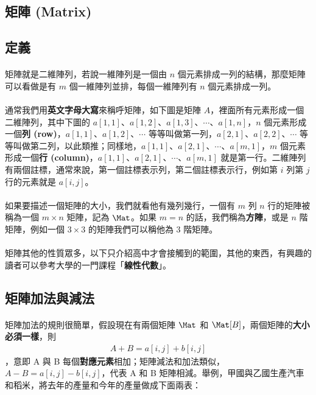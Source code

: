 \documentclass[12pt,a4paper,oneside]{report}
\begin{document}
\begin{CJK}{UTF8}{bkai}
\section{矩陣 (Matrix)}
\subsection{定義}

\paragraph{}矩陣就是二維陣列，若說一維陣列是一個由 $n$ 個元素排成一列的結構，那麼矩陣可以看做是有 $m$ 個一維陣列並排，每個一維陣列有 $n$ 個元素排成一列。
\paragraph{}通常我們用\textbf{英文字母大寫}來稱呼矩陣，如下圖是矩陣 $A$，裡面所有元素形成一個二維陣列，其中下圖的 $a[1,1]$、$a[1,2]$、$a[1,3]$、$\cdots$、$a[1,n]$，$n$ 個元素形成一個\textbf{列 (row)}，$a[1,1]$、$a[1,2]$、$\cdots$ 等等叫做第一列，$a[2,1]$、$a[2,2]$、$\cdots$ 等等叫做第二列，以此類推；同樣地，$a[1,1]$、$a[2,1]$、$\cdots$、$a[m,1]$，$m$ 個元素形成一個\textbf{行 (column)}，$a[1,1]$、$a[2,1]$、$\cdots$、$a[m,1]$ 就是第一行。二維陣列有兩個註標，通常來說，第一個註標表示列，第二個註標表示行，例如第 $i$ 列第 $j$ 行的元素就是 $a[i,j]$。

\paragraph{}如果要描述一個矩陣的大小，我們就看他有幾列幾行，一個有 $m$ 列 $n$ 行的矩陣被稱為一個 $m\times{n}$ 矩陣，記為 \textbf{$\Mat$}。如果 $m=n$ 的話，我們稱為\textbf{方陣}，或是 $n$ 階矩陣，例如一個 $3\times{3}$ 的矩陣我們可以稱他為 $3$ 階矩陣。

\paragraph{}矩陣其他的性質眾多，以下只介紹高中才會接觸到的範圍，其他的東西，有興趣的讀者可以參考大學的一門課程「\textbf{線性代數}」。

\subsection{矩陣加法與減法}

\paragraph{}矩陣加法的規則很簡單，假設現在有兩個矩陣 $\Mat$ 和 $\Mat[B]$，兩個矩陣的\textbf{大小必須一樣}，則
\begin{align*}
A+B=a[i,j]+b[i,j]
\end{align*}
，意即 A 與 B 每個\textbf{對應元素}相加；矩陣減法和加法類似，$A-B=a[i,j]-b[i,j]$，代表 A 和 B 矩陣相減。舉例，甲國與乙國生產汽車和稻米，將去年的產量和今年的產量做成下面兩表：


\end{CJK}
\end{document}
